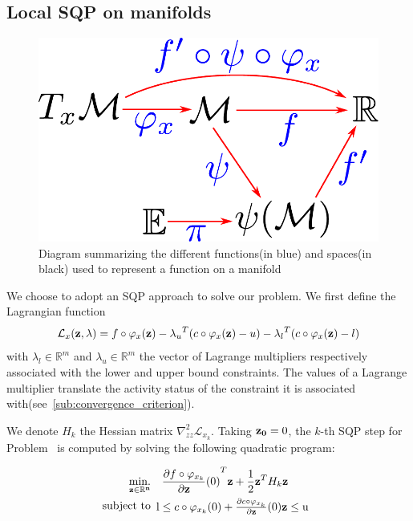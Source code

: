 \subsection{Local SQP on manifolds}
\label{local_sqp_on_manifolds}

\begin{figure}[htpb]
  \centering
  \includegraphics[width=0.5\linewidth]{diagramFunction.pdf}
  \caption{Diagram summarizing the different functions(in blue) and spaces(in black) used to represent a function on a manifold}
\label{fig:diagram_function}
\end{figure}

We choose to adopt an SQP approach to solve our problem.
We first define the Lagrangian function
\begin{equation}
  \mathcal{L}_x ({\bf z}, \lambda) = f\circ \varphi_x({\bf z}) - {\lambda_u}^T (c \circ \varphi_x({\bf z}) - u) - {\lambda_l}^T (c \circ \varphi_x({\bf z}) - l)
\end{equation}
with $\lambda_l \in \mathbb{R}^m$ and $\lambda_u \in \mathbb{R}^m$ the vector of Lagrange multipliers respectively associated with the lower and upper bound constraints.
The values of a Lagrange multiplier translate the activity status of the constraint it is associated with(see~\ref{sub:convergence_criterion}).

We denote $H_k$ the Hessian matrix $\nabla_{zz}^2 \mathcal{L}_{x_k}$.
Taking ${\bf z_0} = 0$, the $k$-th SQP step for Problem~ is computed by solving the following quadratic program:

\begin{align}
  \label{eq:SQPStep}
  \minimize_{\bf z \in \mathbb{R}^n } & \quad {\frac{\partial f\circ \varphi_{x_k}}{\partial {\bf z}}(0)}^T {\bf z } + \frac{1}{2} {\bf z }^T H_k{\bf z }\\
  \text{subject to}&
  \begin{array}{lr}
    \text{l} \leq c\circ \varphi_{x_k}(0) + \frac{\partial c\circ \varphi_{x_k}}{\partial {\bf z}}(0) {\bf z }\leq \text{u}\\
  \end{array} \nonumber%
\end{align}

